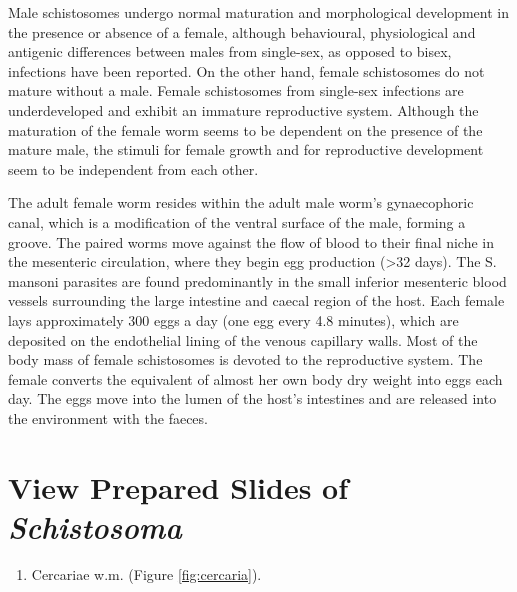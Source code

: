 \documentclass[]{book}
\providecommand{\tightlist}{%
  \setlength{\itemsep}{0pt}\setlength{\parskip}{0pt}}
\begin{document}
Male schistosomes undergo normal maturation and morphological development in the presence or absence of a female, although behavioural, physiological and antigenic differences between males from single-sex, as opposed to bisex, infections have been reported. On the other hand, female schistosomes do not mature without a male. Female schistosomes from single-sex infections are underdeveloped and exhibit an immature reproductive system. Although the maturation of the female worm seems to be dependent on the presence of the mature male, the stimuli for female growth and for reproductive development seem to be independent from each other.

The adult female worm resides within the adult male worm's gynaecophoric canal, which is a modification of the ventral surface of the male, forming a groove. The paired worms move against the flow of blood to their final niche in the mesenteric circulation, where they begin egg production (\textgreater{}32 days). The S. mansoni parasites are found predominantly in the small inferior mesenteric blood vessels surrounding the large intestine and caecal region of the host. Each female lays approximately 300 eggs a day (one egg every 4.8 minutes), which are deposited on the endothelial lining of the venous capillary walls. Most of the body mass of female schistosomes is devoted to the reproductive system. The female converts the equivalent of almost her own body dry weight into eggs each day. The eggs move into the lumen of the host's intestines and are released into the environment with the faeces.

\hypertarget{view-prepared-slides-of-schistosoma}{%
\section{\texorpdfstring{View Prepared Slides of \emph{Schistosoma}}{View Prepared Slides of Schistosoma}}\label{view-prepared-slides-of-schistosoma}}

\begin{enumerate}
\def\labelenumi{\arabic{enumi}.}
\tightlist
\item
  Cercariae w.m. (Figure \ref{fig:cercaria}).
\end{enumerate}
\end{document}
